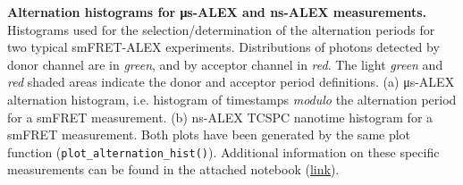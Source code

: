\label{fig:altern_hist_double} 
\textbf{Alternation histograms for μs-ALEX and ns-ALEX measurements.}
Histograms used for the selection/determination
of the alternation periods for two typical smFRET-ALEX experiments.
Distributions of photons detected by donor channel are in \textit{green}, 
and by acceptor channel in \textit{red}.
The light \textit{green} and \textit{red} shaded areas indicate the donor 
and acceptor period definitions.
(a) μs-ALEX alternation histogram, i.e. histogram of timestamps \textit{modulo} 
the alternation period for a smFRET measurement. 
(b) ns-ALEX TCSPC nanotime histogram for a smFRET measurement.
Both plots have been generated by the same plot function 
(\texttt{plot\_alternation\_hist()}).
Additional information on these specific measurements can be found in the 
attached notebook
(\href{http://nbviewer.jupyter.org/github/tritemio/fretbursts_paper/blob/master/notebooks/Figures\%20-\%20ALEX\%20histograms.ipynb}{link}).
